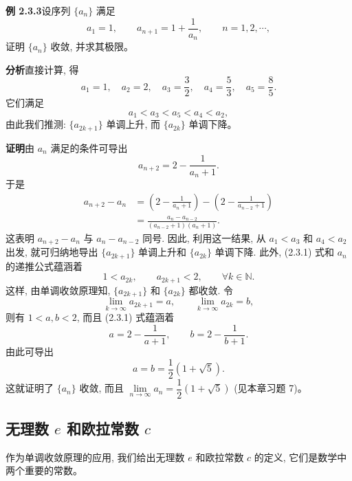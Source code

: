 \documentclass[UTF8,12pt,a4paper,fontset=fandol]{ctexart}
\begin{document}
\noindent\textbf{例 2.3.3}\quad 设序列 $\{a_n\}$ 满足
\[
  a_1=1,\qquad a_{n+1}=1+\frac1{a_n},\qquad n=1,2,\cdots,
\]
证明 $\{a_n\}$ 收敛, 并求其极限。

\noindent\textbf{分析}\quad 直接计算, 得
\[
  a_1=1,\quad a_2=2,\quad a_3=\frac32,\quad a_4=\frac53,\quad a_5=\frac85.
\]
它们满足
\[
  a_1<a_3<a_5<a_4<a_2,
\]
由此我们推测: $\{a_{2k+1}\}$ 单调上升, 而 $\{a_{2k}\}$ 单调下降。

\noindent\textbf{证明}\quad 由 $a_n$ 满足的条件可导出
\begin{equation}
  a_{n+2}=2-\frac1{a_n+1}.
  \tag{2.3.1}
\end{equation}
于是
\[
\begin{aligned}
  a_{n+2}-a_n
  &=
  \left(2-\frac1{a_n+1}\right)
  -
  \left(2-\frac1{a_{n-2}+1}\right)\\
  &=
  \frac{a_n-a_{n-2}}{(a_{n-2}+1)(a_n+1)}.
\end{aligned}
\]
这表明 $a_{n+2}-a_n$ 与 $a_n-a_{n-2}$ 同号. 因此, 利用这一结果, 从 $a_1<a_3$ 和 $a_4<a_2$ 出发, 就可归纳地导出 $\{a_{2k+1}\}$ 单调上升和 $\{a_{2k}\}$ 单调下降. 此外, (2.3.1) 式和 $a_n$ 的递推公式蕴涵着
\[
  1<a_{2k},\qquad a_{2k+1}<2,\qquad \forall k\in\mathbb{N}.
\]
这样, 由单调收敛原理知, $\{a_{2k+1}\}$ 和 $\{a_{2k}\}$ 都收敛. 令
\[
  \lim_{k\to\infty}a_{2k+1}=a,\qquad
  \lim_{k\to\infty}a_{2k}=b,
\]
则有 $1<a,b<2$, 而且 (2.3.1) 式蕴涵着
\[
  a=2-\frac1{a+1},\qquad b=2-\frac1{b+1}.
\]
由此可导出
\[
  a=b=\frac12(1+\sqrt5).
\]
这就证明了 $\{a_n\}$ 收敛, 而且 $\lim\limits_{n\to\infty}a_n=\dfrac12(1+\sqrt5)$ (见本章习题 7)。

\subsection{无理数 $e$ 和欧拉常数 $c$}

作为单调收敛原理的应用, 我们给出无理数 $e$ 和欧拉常数 $c$ 的定义, 它们是数学中两个重要的常数。
\end{document}
